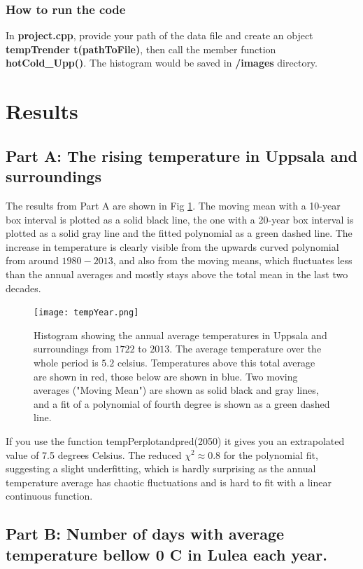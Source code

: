 \documentclass[a4paper]{article}
\begin{document}
\subsubsection{How to run the code}
In \textbf{project.cpp}, provide your path of the data file and create an object\textbf{ tempTrender t(pathToFile)}, then call the member function \textbf{hotCold\_Upp()}. The histogram would be saved in \textbf{/images} directory.



\section{Results}\label{sec:results}
\subsection{Part A: The rising temperature in Uppsala and surroundings}
The results from Part A are shown in Fig \ref{fig:year}. The moving mean with a 10-year box interval is plotted as a solid black line, the one with a 20-year box interval is plotted as a solid gray line and the fitted polynomial as a green dashed line. The increase in temperature is clearly visible from the upwards curved polynomial from around $1980-2013$, and also from the moving means, which fluctuates less than the annual averages and mostly stays above the total mean in the last two decades.
\begin{figure}[H]
   \centering
  \texttt{[image: tempYear.png]}
    \caption{Histogram showing the annual average temperatures in Uppsala and surroundings from $1722$ to $2013$. The average temperature over the whole period is $5.2$ celsius. Temperatures above this total average are shown in red, those below are shown in blue. Two moving averages ("Moving Mean") are shown as solid black and gray lines, and a fit of a polynomial of fourth degree is shown as a green dashed line.}
   \label{fig:year}
\end{figure}
If you use the function tempPerplotandpred(2050) it gives you an extrapolated value of 7.5 degrees Celsius.
The reduced $\chi^2 \approx 0.8$ for the polynomial fit, suggesting a slight underfitting, which is hardly surprising as the annual temperature average has chaotic fluctuations and is hard to fit with a linear continuous function.

\subsection{Part B: Number of days with average temperature bellow 0 C \degree in Lulea each
year.}
\end{document}
